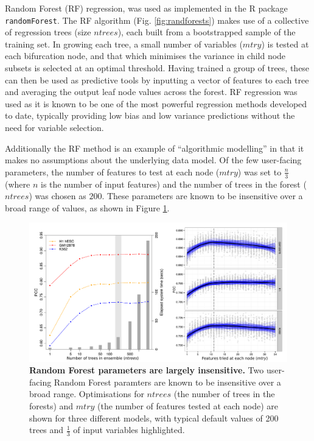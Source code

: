 \documentclass[a4paper,11pt,oneside]{book}
\begin{document}
Random Forest (RF) regression,\cite{Breiman2001a}  was used
as implemented in the R package \texttt{randomForest}.\cite{Liaw2002}
The RF algorithm (Fig. \ref{fig:randforests}) makes use of a collective of regression trees (size $ntrees$), each built from a
bootstrapped sample of the training set. In growing each tree, a small
number of variables ($mtry$) is tested at each bifurcation node, and that which minimises the
variance in child node subsets is selected at an optimal threshold. Having trained a group of trees, these can then be used as
predictive tools by inputting a vector of features to each tree and
averaging the output leaf node values across the forest. RF regression
was used as it is known to be one of the most powerful regression
methods developed to date,\cite{Svetnik2003, Cutler2007} typically
providing low bias and low variance predictions without the need for
variable selection.\cite{Diaz2006, Dasgupta2012}

Additionally the RF method is an example of ``algorithmic
modelling''\cite{Breiman2001b} in that it makes no assumptions about the
underlying data model.
Of the few user-facing parameters, the number of features to test at each node ($mtry$) was set to $\frac{n}{3}$ (where $n$ is the number of input features) and the number of trees in the forest ($ntrees$) was chosen as
$200$. These parameters are known to be insensitive over a broad range of values,\cite{Dasgupta2012, Hastie2001} as shown in Figure \ref{fig:rfparam}.

\begin{figure}
\begin{center}
\includegraphics[width=5in]{rfparams.pdf}
\captionsetup{width=\textwidth}
\caption[Random Forest parameters are largely insensitive.]{ {\bf Random Forest parameters are largely insensitive. } 
Two user-facing Random Forest paramters are known to be insensitive over a broad range.\cite{Hastie2001} Optimisations for $ntrees$ (the number of trees in the forests) and $mtry$ (the number of features tested at each node) are shown for three different models, with typical default values of 200 trees and $\frac{1}{3}$ of input variables highlighted.
}\label{fig:rfparam}
\end{center}
\end{figure} 
\end{document}
